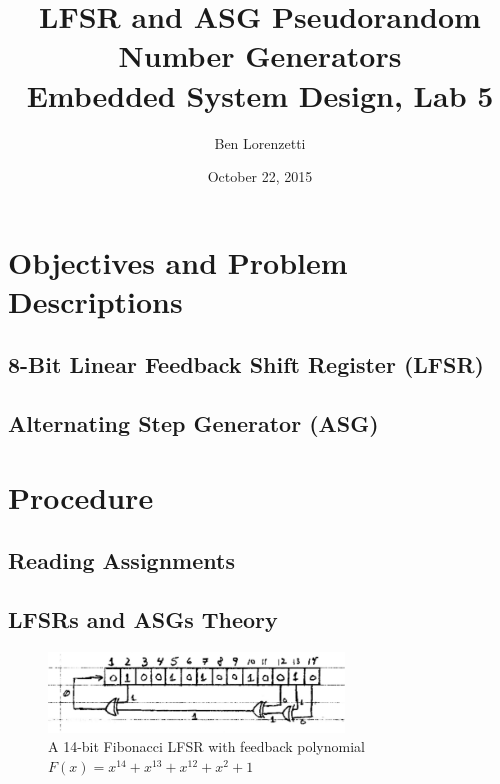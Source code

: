 \documentclass[11pt]{article}
\begin{document}
\title{LFSR and ASG Pseudorandom Number Generators\\Embedded System Design, Lab 5}
\date{October 22, 2015}
\author{Ben Lorenzetti}
\maketitle

\tableofcontents

\clearpage

\section{Objectives and Problem Descriptions}
\subsection{8-Bit Linear Feedback Shift Register (LFSR)}
\label{problem-1-specs}

\subsection{Alternating Step Generator (ASG)}
\label{problem-2-spces}

\section{Procedure}
\subsection{Reading Assignments}

\subsection{LFSRs and ASGs Theory}

\begin{figure}
	\centering
	\includegraphics[width=0.7\textwidth]{Figures/14-bit-fibonacci-with-feedback-polynomial.pdf}
	\caption{A 14-bit Fibonacci LFSR with feedback polynomial $F(x)=x^{14}+x^{13}+x^{12}+x^{2}+1$}
	\label{14-bit-fibonacci-with-feedback-polynomial}
\end{figure}
\end{document}
